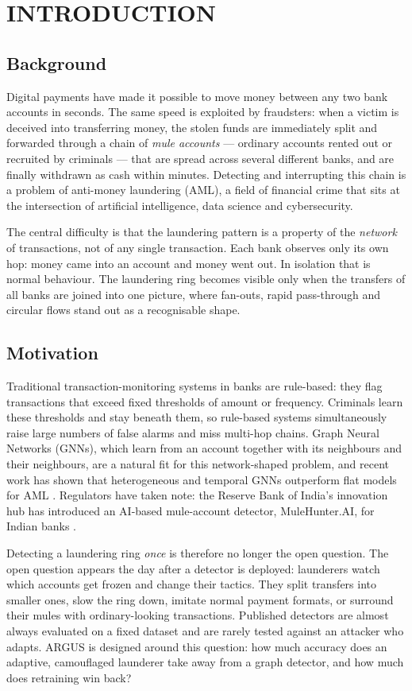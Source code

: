 \chapter{INTRODUCTION}

\section{Background}
Digital payments have made it possible to move money between any two bank accounts in seconds. The same speed is exploited by fraudsters: when a victim is deceived into transferring money, the stolen funds are immediately split and forwarded through a chain of \emph{mule accounts} --- ordinary accounts rented out or recruited by criminals --- that are spread across several different banks, and are finally withdrawn as cash within minutes. Detecting and interrupting this chain is a problem of anti-money laundering (AML), a field of financial crime that sits at the intersection of artificial intelligence, data science and cybersecurity.

The central difficulty is that the laundering pattern is a property of the \emph{network} of transactions, not of any single transaction. Each bank observes only its own hop: money came into an account and money went out. In isolation that is normal behaviour. The laundering ring becomes visible only when the transfers of all banks are joined into one picture, where fan-outs, rapid pass-through and circular flows stand out as a recognisable shape.

\section{Motivation}
Traditional transaction-monitoring systems in banks are rule-based: they flag transactions that exceed fixed thresholds of amount or frequency. Criminals learn these thresholds and stay beneath them, so rule-based systems simultaneously raise large numbers of false alarms and miss multi-hop chains. Graph Neural Networks (GNNs), which learn from an account together with its neighbours and their neighbours, are a natural fit for this network-shaped problem, and recent work has shown that heterogeneous and temporal GNNs outperform flat models for AML \cite{johannessen2025finding, digennaro2024amatriciana}. Regulators have taken note: the Reserve Bank of India's innovation hub has introduced an AI-based mule-account detector, MuleHunter.AI, for Indian banks \cite{rbih2024mulehunter}.

Detecting a laundering ring \emph{once} is therefore no longer the open question. The open question appears the day after a detector is deployed: launderers watch which accounts get frozen and change their tactics. They split transfers into smaller ones, slow the ring down, imitate normal payment formats, or surround their mules with ordinary-looking transactions. Published detectors are almost always evaluated on a fixed dataset and are rarely tested against an attacker who adapts. ARGUS is designed around this question: how much accuracy does an adaptive, camouflaged launderer take away from a graph detector, and how much does retraining win back?

